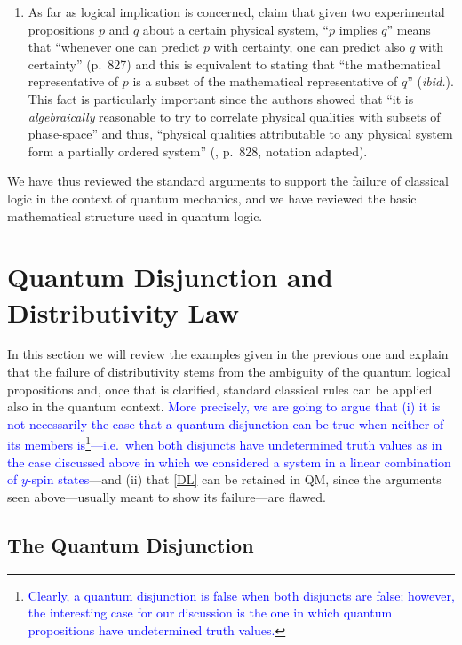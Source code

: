 \documentclass[11pt, executivepaper]{article}
\begin{document}
\begin{enumerate}
\item As far as logical implication is concerned, \cite{vonNeumann:1936} claim that given two experimental propositions $p$ and $q$ about a certain physical system, ``$p$ implies $q$'' means that ``whenever one can predict $p$ with certainty, one can predict also $q$ with certainty'' (p.\ 827) and this is equivalent to stating that ``the mathematical representative of $p$ is a subset of the mathematical representative of $q$'' (\emph{ibid.}). This fact is particularly important since the authors showed that ``it is \emph{algebraically} reasonable to try to correlate physical qualities with subsets of phase-space'' and thus, ``physical qualities attributable to any physical system form a partially ordered system'' (\cite{vonNeumann:1936}, p.\ 828, notation adapted).
\end{enumerate}

We have thus reviewed the standard arguments to support the failure of classical logic in the context of quantum mechanics, and we have reviewed the basic mathematical structure used in quantum logic.


\section{Quantum Disjunction and Distributivity Law}
\label{Motivations}

In this section we will review the examples given in the previous one and explain that the failure of distributivity stems from the ambiguity of the quantum logical propositions and, once that is clarified, standard classical rules can be applied also in the quantum context. \textcolor{blue}{More precisely, we are going to argue that (i) it is not necessarily the case that a quantum disjunction can be true when neither of its members is\footnote{\textcolor{blue}{Clearly, a quantum disjunction is false when both disjuncts are false; however, the interesting case for our discussion is the one in which quantum propositions have undetermined truth values.}}---i.e.\ when both disjuncts have undetermined truth values as in the case discussed above in which we considered a system in a linear combination of $y$-spin states}---and (ii) that \eqref{DL} can be retained in QM, since the arguments seen above---usually meant to show its failure---are flawed.

\subsection{The Quantum Disjunction}
\end{document}
